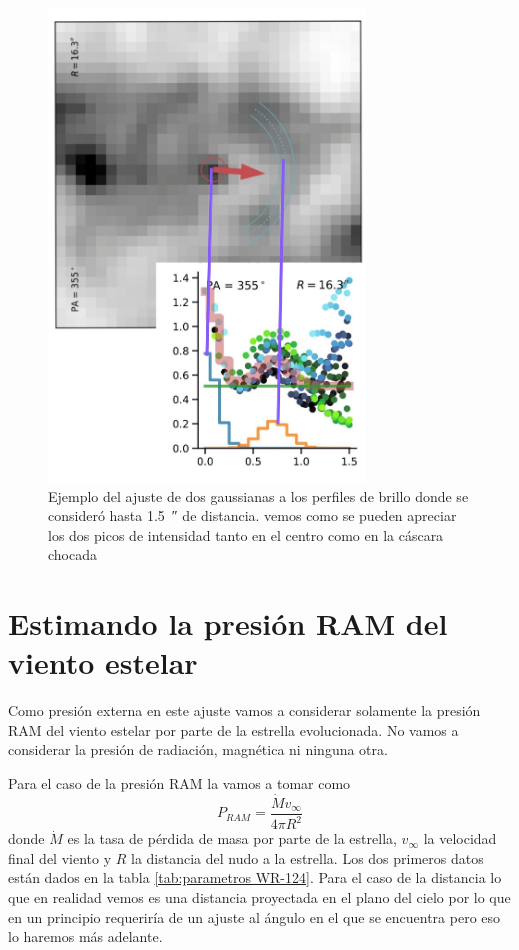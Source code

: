\documentclass{book}
\begin{document}
\begin{figure}[h]
    \centering
    \includegraphics[width=0.75\textwidth]{images Chapter 3/C_3_Ajuste.jpg}
    \caption{Ejemplo del ajuste de dos gaussianas a los perfiles de brillo donde se consideró hasta \SI{1.5}{\arcsecond} de distancia. vemos como se pueden apreciar los dos picos de intensidad tanto en el centro como en la cáscara chocada}
    \label{ejemplo ajuste}
\end{figure}

\section{Estimando la presión RAM del viento estelar}

Como presión externa en este ajuste vamos a considerar solamente la presión RAM del viento estelar por parte de la estrella evolucionada. No vamos a considerar la presión de radiación, magnética ni ninguna otra. 

Para el caso de la presión RAM la vamos a tomar como \[P_{RAM}= \frac{\dot{M}v_\infty}{4\pi R^2}\] donde $\dot{M}$ es la tasa de pérdida de masa por parte de la estrella, $v_\infty$ la velocidad final del viento y $R$ la distancia del nudo a la estrella. Los dos primeros datos están dados en la tabla \ref{tab:parametros WR-124}. Para el caso de la distancia lo que en realidad vemos es una distancia proyectada en el plano del cielo por lo que en un principio requeriría de un ajuste al ángulo en el que se encuentra pero eso lo haremos más adelante.
\end{document}
